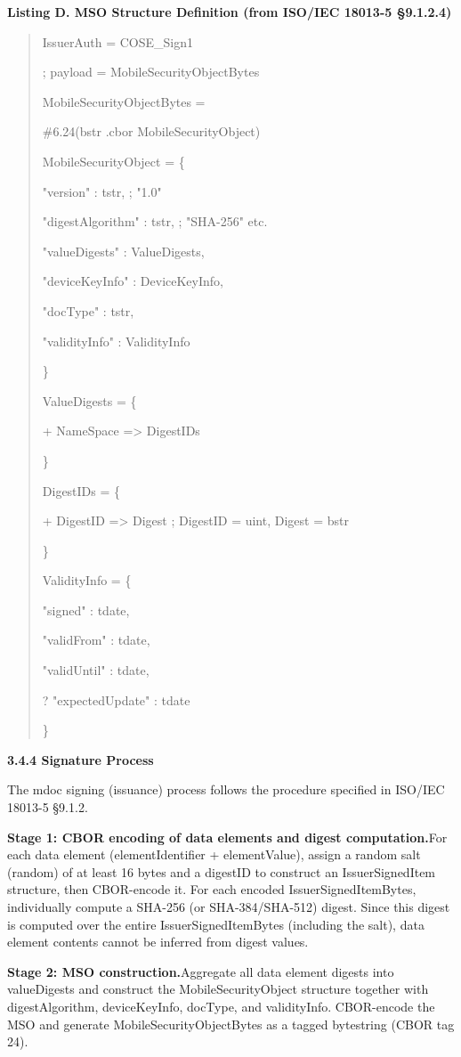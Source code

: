 \textbf{Listing D. MSO Structure Definition (from ISO/IEC 18013-5 §9.1.2.4)}

\begin{quote}
IssuerAuth = COSE\_Sign1

; payload = MobileSecurityObjectBytes

MobileSecurityObjectBytes =

\#6.24(bstr .cbor MobileSecurityObject)

MobileSecurityObject = \{

"version" : tstr, ; "1.0"

"digestAlgorithm" : tstr, ; "SHA-256" etc.

"valueDigests" : ValueDigests,

"deviceKeyInfo" : DeviceKeyInfo,

"docType" : tstr,

"validityInfo" : ValidityInfo

\}

ValueDigests = \{

+ NameSpace =\textgreater{} DigestIDs

\}

DigestIDs = \{

+ DigestID =\textgreater{} Digest ; DigestID = uint, Digest = bstr

\}

ValidityInfo = \{

"signed" : tdate,

"validFrom" : tdate,

"validUntil" : tdate,

? "expectedUpdate" : tdate

\}
\end{quote}

\textbf{3.4.4 Signature Process}

The mdoc signing (issuance) process follows the procedure specified in ISO/IEC 18013-5 §9.1.2.

\textbf{Stage 1: CBOR encoding of data elements and digest computation.}For each data element (elementIdentifier + elementValue), assign a random salt (random) of at least 16 bytes and a digestID to construct an IssuerSignedItem structure, then CBOR-encode it. For each encoded IssuerSignedItemBytes, individually compute a SHA-256 (or SHA-384/SHA-512) digest. Since this digest is computed over the entire IssuerSignedItemBytes (including the salt), data element contents cannot be inferred from digest values.

\textbf{Stage 2: MSO construction.}Aggregate all data element digests into valueDigests and construct the MobileSecurityObject structure together with digestAlgorithm, deviceKeyInfo, docType, and validityInfo. CBOR-encode the MSO and generate MobileSecurityObjectBytes as a tagged bytestring (CBOR tag 24).

